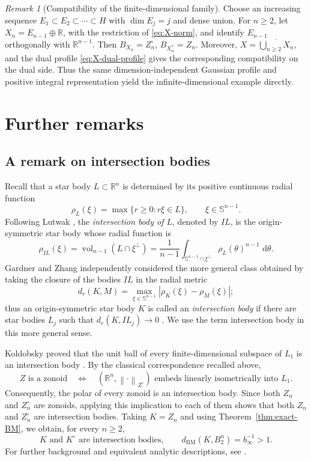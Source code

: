 \documentclass[11pt]{article}
\theoremstyle{definition}
\theoremstyle{remark}
\newtheorem{remark}[theorem]{Remark}
\newcommand{\R}{\mathbb R}
\newcommand{\Sph}{\mathbb S}
\newcommand{\dd}{\,\mathrm d}
\newcommand{\abs}[1]{\left|#1\right|}
\newcommand{\norm}[1]{\left\|#1\right\|}
\newcommand{\BM}{\mathrm{BM}}
\begin{document}
\begin{remark}[Compatibility of the finite-dimensional family]
Choose an increasing sequence
$E_1\subset E_2\subset\cdots\subset H$ with $\dim E_j=j$ and dense
union.  For $n\geq2$, let $X_n=E_{n-1}\oplus\R$, with the restriction
of \eqref{eq:X-norm}, and identify $E_{n-1}$ orthogonally with
$\R^{n-1}$.  Then
 $B_{X_n}=Z_n^\circ$, 
 $B_{X_n^*}=Z_n$.
 Moreover, $X=\overline{\bigcup_{n\geq2}X_n}$, and the dual profile
\eqref{eq:X-dual-profile} gives the corresponding compatibility on the
dual side.  Thus the same dimension-independent Gaussian profile and positive
integral representation yield the infinite-dimensional example
directly.
\end{remark}

\section{Further remarks}\label{sec:rem}

\subsection{A remark on intersection bodies}

Recall that a star body $L\subset\R^n$ is determined by its positive
continuous radial function
\[
 \rho_L(\xi)=\max\{r\geq0:r\xi\in L\},
 \qquad \xi\in\Sph^{n-1}.
\]
Following Lutwak \cite{Lutwak1988}, the \emph{intersection body of
$L$}, denoted by $IL$, is the origin-symmetric star body whose radial
function is
\begin{equation}\label{eq:Lutwak-intersection-body}
 \rho_{IL}(\xi)
 =
 \operatorname{vol}_{n-1}(L\cap\xi^\perp)
 =
 \frac1{n-1}
 \int_{\Sph^{n-1}\cap\xi^\perp}
       \rho_L(\theta)^{n-1}\,\dd\theta .
\end{equation}
Gardner and Zhang independently considered the more general class
obtained by taking the closure of the bodies $IL$ in the radial
metric
\[
 d_r(K,M)
 =
 \max_{\xi\in\Sph^{n-1}}
 \abs{\rho_K(\xi)-\rho_M(\xi)};
\]
thus an origin-symmetric star body $K$ is called an
\emph{intersection body} if there are star bodies $L_j$ such that
$d_r(K,IL_j)\to0$ \cite{Gardner1994,Zhang1994Centered}.  We use the
term intersection body in this more general sense.

Koldobsky proved that the unit ball of every finite-dimensional
subspace of $L_1$ is an intersection body
\cite[Theorem~3]{Koldobsky1998}.  By the classical correspondence
recalled above,
\[
 Z\text{ is a zonoid}
 \quad\Longleftrightarrow\quad
 (\R^n,\norm{\cdot}_{Z^\circ})
 \text{ embeds linearly isometrically into }L_1.
\]
Consequently, the polar of every zonoid is an intersection body.
Since both $Z_n$ and $Z_n^\circ$ are zonoids, applying this implication
to each of them shows that both $Z_n$ and $Z_n^\circ$ are intersection
bodies.  Taking $K=Z_n$ and using
Theorem~\ref{thm:exact-BM}, we obtain, for every $n\geq2$,
\[
 K\text{ and }K^\circ\text{ are intersection bodies},
 \qquad
 d_{\BM}(K,B_2^n)=b_\infty^{-1}>1.
\]
For further background and equivalent analytic descriptions, see
\cite[Chapters~4--6, in particular p.~127]{Koldobsky2005}.
\end{document}
